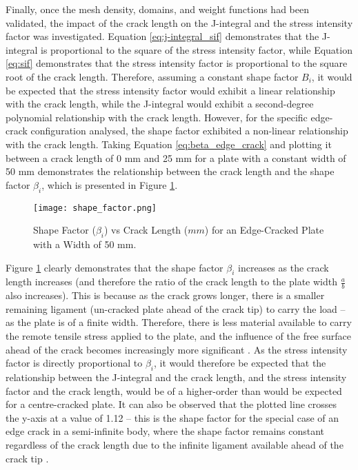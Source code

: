 Finally, once the mesh density, domains, and weight functions had been validated, the impact of the crack length on the J-integral and the stress intensity factor was investigated. Equation \ref{eq:j-integral_sif} demonstrates that the J-integral is proportional to the square of the stress intensity factor, while Equation \ref{eq:sif} demonstrates that the stress intensity factor is proportional to the square root of the crack length. Therefore, assuming a constant shape factor $B_i$, it would be expected that the stress intensity factor would exhibit a linear relationship with the crack length, while the J-integral would exhibit a second-degree polynomial relationship with the crack length. However, for the specific edge-crack configuration analysed, the shape factor exhibited a non-linear relationship with the crack length. Taking Equation \ref{eq:beta_edge_crack} and plotting it between a crack length of 0 mm and 25 mm for a plate with a constant width of 50 mm demonstrates the relationship between the crack length and the shape factor $\beta_{i}$, which is presented in Figure \ref{fig:shape_factor}.

\begin{figure}[H]
	\centering
	\texttt{[image: shape\_factor.png]}
	\caption{Shape Factor ($\beta_{i}$) vs Crack Length ($mm$) for an Edge-Cracked Plate with a Width of 50 mm.}
	\label{fig:shape_factor}
\end{figure}

Figure \ref{fig:shape_factor} clearly demonstrates that the shape factor $\beta_{i}$ increases as the crack length increases (and therefore the ratio of the crack length to the plate width $\frac{a}{b}$ also increases). This is because as the crack grows longer, there is a smaller remaining ligament (un-cracked plate ahead of the crack tip) to carry the load -- as the plate is of a finite width. Therefore, there is less material available to carry the remote tensile stress applied to the plate, and the influence of the free surface ahead of the crack becomes increasingly more significant \cite{anderson_fracture_2017}. As the stress intensity factor is directly proportional to $\beta_{i}$, it would therefore be expected that the relationship between the J-integral and the crack length, and the stress intensity factor and the crack length, would be of a higher-order than would be expected for a centre-cracked plate. It can also be observed that the plotted line crosses the y-axis at a value of 1.12 -- this is the shape factor for the special case of an edge crack in a semi-infinite body, where the shape factor remains constant regardless of the crack length due to the infinite ligament available ahead of the crack tip \cite{yuan_research_2023}.

